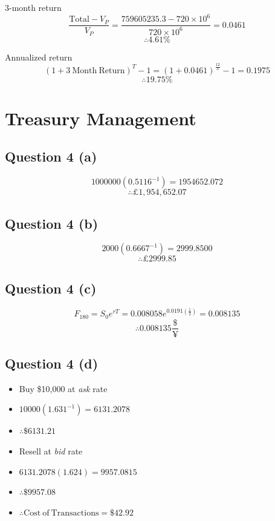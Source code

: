 \documentclass[11pt, english]{article}
\begin{document}
	3-month return
	$$\frac{\mathrm{Total}-V_P}{V_P}=\frac{759605235.3-720\times10^6}{720\times10^6}=0.0461$$
	$$\therefore4.61\%$$

	Annualized return
	$$(1+3\ \mathrm{Month\ Return})^T-1=(1+0.0461)^{\frac{12}{3}}-1=0.1975$$
	$$\therefore19.75\%$$

\newpage

\section{Treasury Management}

	\subsection{Question 4 (a)}

	$$1000000(0.5116^{-1})=1954652.072$$
	$$\therefore\pounds1,954,652.07$$

	\subsection{Question 4 (b)}
	
	$$2000(0.6667^{-1})=2999.8500$$
	$$\therefore\pounds2999.85$$

	\subsection{Question 4 (c)}

	$$F_{180}=S_0e^{rT}=0.008058e^{0.0191\left(\frac{1}{2}\right)}=0.008135$$
	$$\therefore0.008135\frac{\$}{\yen}$$

	\subsection{Question 4 (d)}

	\begin{itemize}
	\setlength\itemsep{0cm}
		\item Buy \$10,000 at \textit{ask} rate
		\item $10000(1.631^{-1})=6131.2078$
		\item $\therefore\$6131.21$
		\item Resell at \textit{bid} rate
		\item $6131.2078(1.624)=9957.0815$
		\item $\therefore\$9957.08$
		\item $\therefore\mathrm{Cost\ of\ Transactions}=\$42.92$
	\end{itemize}
\end{document}
